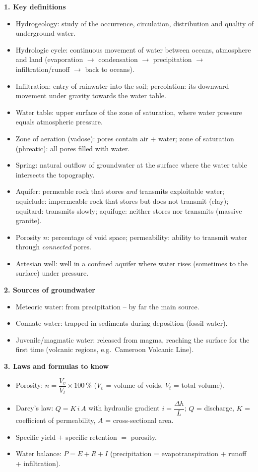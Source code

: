 \documentclass[11pt]{article}
\newcommand{\cle}[1]{{\popxbold\color{popdark}#1}}
\begin{document}
\begin{bilan}
\textbf{1. Key definitions}
\begin{itemize}
\item \cle{Hydrogeology}: study of the occurrence, circulation, distribution and quality of underground water.
\item \cle{Hydrologic cycle}: continuous movement of water between oceans, atmosphere and land (evaporation $\rightarrow$ condensation $\rightarrow$ precipitation $\rightarrow$ infiltration/runoff $\rightarrow$ back to oceans).
\item \cle{Infiltration}: entry of rainwater into the soil; \cle{percolation}: its downward movement under gravity towards the water table.
\item \cle{Water table}: upper surface of the zone of saturation, where water pressure equals atmospheric pressure.
\item \cle{Zone of aeration} (vadose): pores contain air + water; \cle{zone of saturation} (phreatic): all pores filled with water.
\item \cle{Spring}: natural outflow of groundwater at the surface where the water table intersects the topography.
\item \cle{Aquifer}: permeable rock that stores \emph{and} transmits exploitable water; \cle{aquiclude}: impermeable rock that stores but does not transmit (clay); \cle{aquitard}: transmits slowly; \cle{aquifuge}: neither stores nor transmits (massive granite).
\item \cle{Porosity} $n$: percentage of void space; \cle{permeability}: ability to transmit water through \emph{connected} pores.
\item \cle{Artesian well}: well in a confined aquifer where water rises (sometimes to the surface) under pressure.
\end{itemize}

\textbf{2. Sources of groundwater}
\begin{itemize}
\item \cle{Meteoric water}: from precipitation -- by far the main source.
\item \cle{Connate water}: trapped in sediments during deposition (fossil water).
\item \cle{Juvenile/magmatic water}: released from magma, reaching the surface for the first time (volcanic regions, e.g.\ Cameroon Volcanic Line).
\end{itemize}

\textbf{3. Laws and formulas to know}
\begin{itemize}
\item Porosity: $n = \dfrac{V_v}{V_t}\times 100\ \%$ ($V_v$ = volume of voids, $V_t$ = total volume).
\item \cle{Darcy's law}: $Q = K\,i\,A$ with hydraulic gradient $i = \dfrac{\Delta h}{L}$; $Q$ = discharge, $K$ = coefficient of permeability, $A$ = cross-sectional area.
\item Specific yield $+$ specific retention $=$ porosity.
\item Water balance: $P = E + R + I$ (precipitation = evapotranspiration + runoff + infiltration).
\end{itemize}


\end{bilan}
\end{document}
